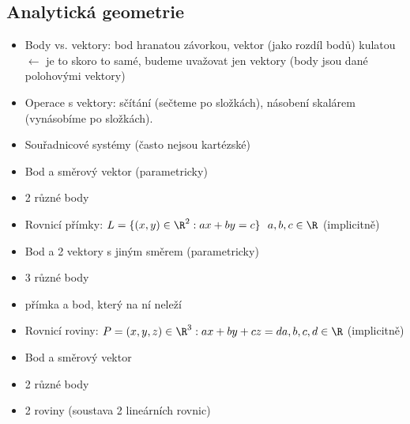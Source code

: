 \documentclass[12pt]{article}					%
\begin{document}
    \subsection{Analytická geometrie}
        \begin{poznamka}[Názvosloví]
            \begin{itemize}
                \item Body vs. vektory: bod hranatou závorkou, vektor (jako rozdíl bodů) kulatou $\leftarrow$ je to skoro to samé, budeme uvažovat jen vektory (body jsou dané polohovými vektory)
                \item Operace s vektory: sčítání (sečteme po složkách), násobení skalárem (vynásobíme po složkách).
                \item Souřadnicové systémy (často nejsou kartézské)
            \end{itemize}
        \end{poznamka}

        \begin{poznamka}
            \begin{itemize}
                \item Bod a směrový vektor (parametricky)
                \item 2 různé body
                \item Rovnicí přímky: $L = \{(x, y)\in \R^2: ax + by = c\}\ \ a, b, c \in \R$ (implicitně)
            \end{itemize}
        \end{poznamka}

        \begin{poznamka}
            \begin{itemize}
                \item Bod a 2 vektory s jiným směrem (parametricky)
                \item 3 různé body
                \item přímka a bod, který na ní neleží
                \item Rovnicí roviny: $P = {(x, y, z)\in \R^3: ax + by + cz = d}  a, b, c, d \in \R$  (implicitně)
            \end{itemize}
        \end{poznamka}

        \begin{poznamka}
            \begin{itemize}
                \item Bod a směrový vektor
                \item 2 různé body
                \item 2 roviny (soustava 2 lineárních rovnic)
            \end{itemize}
        \end{poznamka}
\end{document}

